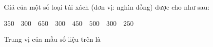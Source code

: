 \begin{ex}
Giá của một số loại túi xách (đơn vị: nghìn đồng) được cho như sau:
\begin{center}
$350 \quad 300 \quad 650 \quad 300 \quad 450 \quad 500 \quad 300 \quad 250$
\end{center}
Trung vị của mẫu số liệu trên là
\end{ex}
